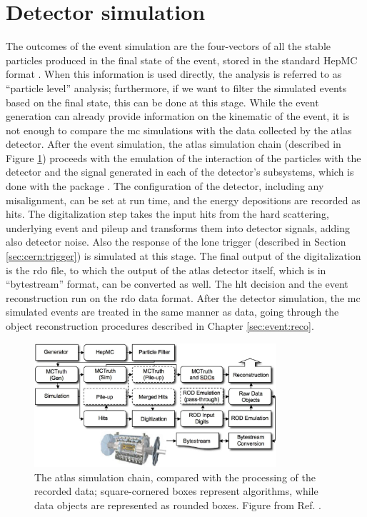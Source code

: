 \section{Detector simulation}
\label{sec:detsim}

The outcomes of the event simulation are the four-vectors of all the stable particles produced in the final state of the event, stored in the standard HepMC format \cite{Dobbs:2001ck}.
When this information is used directly, the analysis is referred to as ``particle level'' analysis; furthermore, if we want to filter the simulated events based on the final state, this can be done at this stage. 
While the event generation can already provide information on the kinematic of the event, it is not enough to compare the \gls{mc} simulations with the 
data collected by the \gls{atlas} detector. 
After the event simulation, the \gls{atlas} simulation chain \cite{Aad:2010ah} (described in Figure \ref{fig:sim:chain}) proceeds with the emulation of the
interaction of the particles with the detector and the signal generated in each of the detector's subsystems, 
which is done with the \geant package \cite{Agostinelli:2002hh}. The configuration of the detector, including any misalignment, can be set at run time, and the energy depositions are recorded as hits. The digitalization step takes the input hits from the hard scattering, underlying event and pileup and transforms them into detector signals, adding also detector noise. Also the response of the \gls{lone} trigger (described in Section \ref{sec:cern:trigger}) is simulated at this stage. The final output of the digitalization is the \gls{rdo} file, to which the output of the \gls{atlas} detector itself, which is in ``bytestream'' format, can be converted as well. The \gls{hlt} decision and the event reconstruction run on the \gls{rdo} data format. After the detector simulation, the \gls{mc} simulated events are treated in the same manner as data, going through the object reconstruction procedures
described in Chapter \ref{sec:event:reco}.

\begin{figure}[h]
\begin{center}
    \includegraphics[width=0.8\textwidth]{figures/simul/outline_v2}
\end{center}
\caption{The \gls{atlas} simulation chain, compared with the processing of the recorded data; square-cornered boxes represent algorithms, while data objects are represented as rounded boxes. Figure from Ref. \cite{Aad:2010ah}.}
 \label{fig:sim:chain}
\end{figure}

